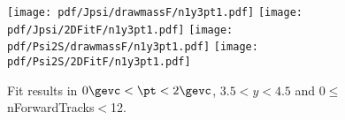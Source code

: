 \begin{figure}[H]
\begin{center}
\texttt{[image: pdf/Jpsi/drawmassF/n1y3pt1.pdf]}
\texttt{[image: pdf/Jpsi/2DFitF/n1y3pt1.pdf]}
\vspace*{-0.5cm}
\texttt{[image: pdf/Psi2S/drawmassF/n1y3pt1.pdf]}
\texttt{[image: pdf/Psi2S/2DFitF/n1y3pt1.pdf]}
\vspace*{-0.5cm}
\end{center}
\caption{Fit results in $0\gevc<\pt<2\gevc$, $3.5<y<4.5$ and 0$\leq$nForwardTracks$<$12.}
\label{Fitn1y3pt1}
\end{figure}
